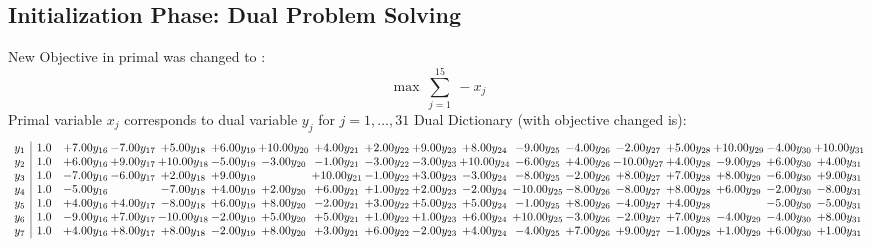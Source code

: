 \documentclass[9pt]{article}
\begin{document}
\subsection{Initialization Phase: Dual Problem Solving}
New Objective in primal was changed to : \[ \max\ \sum_{j=1}^{15}\ - x_j \] 
Primal variable $x_j$ corresponds to dual variable $y_j$ for $j = 1,\ldots,31$
Dual Dictionary (with objective changed is): 
\[\begin{array}{c| c c@{\hskip 2pt} c@{\hskip 2pt} c@{\hskip 2pt} c@{\hskip 2pt} c@{\hskip 2pt} c@{\hskip 2pt} c@{\hskip 2pt} c@{\hskip 2pt} c@{\hskip 2pt} c@{\hskip 2pt} c@{\hskip 2pt} c@{\hskip 2pt} c@{\hskip 2pt} c@{\hskip 2pt} c@{\hskip 2pt} c@{\hskip 2pt} }
 y_{1}   &  1.0 & +  7.00 y_{16} & -7.00 y_{17} & +  5.00 y_{18} & +  6.00 y_{19} & + 10.00 y_{20} & +  4.00 y_{21} & +  2.00 y_{22} & +  9.00 y_{23} & +  8.00 y_{24} & -9.00 y_{25} & -4.00 y_{26} & -2.00 y_{27} & +  5.00 y_{28} & + 10.00 y_{29} & -4.00 y_{30} & + 10.00 y_{31}\\
 y_{2}   &  1.0 & +  6.00 y_{16} & +  9.00 y_{17} & + 10.00 y_{18} & -5.00 y_{19} & -3.00 y_{20} & -1.00 y_{21} & -3.00 y_{22} & -3.00 y_{23} & + 10.00 y_{24} & -6.00 y_{25} & +  4.00 y_{26} & -10.00 y_{27} & +  4.00 y_{28} & -9.00 y_{29} & +  6.00 y_{30} & +  4.00 y_{31}\\
 y_{3}   &  1.0 & -7.00 y_{16} & -6.00 y_{17} & +  2.00 y_{18} & +  9.00 y_{19} &   & + 10.00 y_{21} & -1.00 y_{22} & +  3.00 y_{23} & -3.00 y_{24} & -8.00 y_{25} & -2.00 y_{26} & +  8.00 y_{27} & +  7.00 y_{28} & +  8.00 y_{29} & -6.00 y_{30} & +  9.00 y_{31}\\
 y_{4}   &  1.0 & -5.00 y_{16} &   & -7.00 y_{18} & +  4.00 y_{19} & +  2.00 y_{20} & +  6.00 y_{21} & +  1.00 y_{22} & +  2.00 y_{23} & -2.00 y_{24} & -10.00 y_{25} & -8.00 y_{26} & -8.00 y_{27} & +  8.00 y_{28} & +  6.00 y_{29} & -2.00 y_{30} & -8.00 y_{31}\\
 y_{5}   &  1.0 & +  4.00 y_{16} & +  4.00 y_{17} & -8.00 y_{18} & +  6.00 y_{19} & +  8.00 y_{20} & -2.00 y_{21} & +  3.00 y_{22} & +  5.00 y_{23} & +  5.00 y_{24} & -1.00 y_{25} & +  8.00 y_{26} & -4.00 y_{27} & +  4.00 y_{28} &   & -5.00 y_{30} & -5.00 y_{31}\\
 y_{6}   &  1.0 & -9.00 y_{16} & +  7.00 y_{17} & -10.00 y_{18} & -2.00 y_{19} & +  5.00 y_{20} & +  5.00 y_{21} & +  1.00 y_{22} & +  1.00 y_{23} & +  6.00 y_{24} & + 10.00 y_{25} & -3.00 y_{26} & -2.00 y_{27} & +  7.00 y_{28} & -4.00 y_{29} & -4.00 y_{30} & +  8.00 y_{31}\\
 y_{7}   &  1.0 & +  4.00 y_{16} & +  8.00 y_{17} & +  8.00 y_{18} & -2.00 y_{19} & +  8.00 y_{20} & +  3.00 y_{21} & +  6.00 y_{22} & -2.00 y_{23} & +  4.00 y_{24} & -4.00 y_{25} & +  7.00 y_{26} & +  9.00 y_{27} & -1.00 y_{28} & +  1.00 y_{29} & +  6.00 y_{30} & +  1.00 y_{31}\\

\end{array}\]
\end{document}
